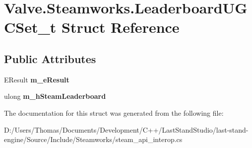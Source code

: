 \hypertarget{structValve_1_1Steamworks_1_1LeaderboardUGCSet__t}{}\section{Valve.\+Steamworks.\+Leaderboard\+U\+G\+C\+Set\+\_\+t Struct Reference}
\label{structValve_1_1Steamworks_1_1LeaderboardUGCSet__t}
\subsection*{Public Attributes}
\begin{DoxyCompactItemize}
\item 
\hypertarget{structValve_1_1Steamworks_1_1LeaderboardUGCSet__t_a882efa620bdd870901a0411f8df32756}{}E\+Result {\bfseries m\+\_\+e\+Result}\label{structValve_1_1Steamworks_1_1LeaderboardUGCSet__t_a882efa620bdd870901a0411f8df32756}

\item 
\hypertarget{structValve_1_1Steamworks_1_1LeaderboardUGCSet__t_a9e0433f9d1a1813eb5e02ff0772368bc}{}ulong {\bfseries m\+\_\+h\+Steam\+Leaderboard}\label{structValve_1_1Steamworks_1_1LeaderboardUGCSet__t_a9e0433f9d1a1813eb5e02ff0772368bc}

\end{DoxyCompactItemize}


The documentation for this struct was generated from the following file\+:\begin{DoxyCompactItemize}
\item 
D\+:/\+Users/\+Thomas/\+Documents/\+Development/\+C++/\+Last\+Stand\+Studio/last-\/stand-\/engine/\+Source/\+Include/\+Steamworks/steam\+\_\+api\+\_\+interop.\+cs\end{DoxyCompactItemize}
